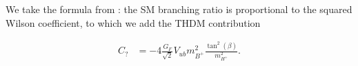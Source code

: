 \documentclass[preprint,3p,12pt]{elsarticle}
\newcommand{\HEPfit}{\texttt{HEPfit}\xspace}
\begin{document}
We take the formula from \cite{Hou:1992sy}: the SM branching ratio is proportional to the squared Wilson coefficient, to which we add the THDM contribution

\begin{align}
 C_? &= -4 \frac{G_F}{\sqrt{2}} V_{ub} m_{B^+}^2 \frac{\tan ^2 (\beta)}{m_{H^+}^2}. \nonumber
\end{align}



\end{document}
